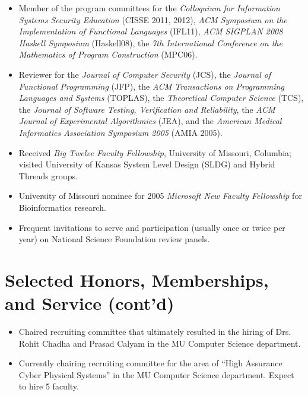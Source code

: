 \documentclass[11pt]{article}
\begin{document}
\begin{itemize}[leftmargin=0mm]
\item[]  Member of the program committees for the {\em Colloquium for Information Systems Security Education} (CISSE 2011, 2012), {\em ACM Symposium on the Implementation of Functional Languages} (IFL11), {\em ACM SIGPLAN 2008
    Haskell Symposium} (Haskell08), the {\em 7th International
Conference on the Mathematics of Program Construction} (MPC06).

\item[] Reviewer for the {\em Journal of Computer Security} (JCS), the {\em Journal of Functional Programming} (JFP),
the {\em ACM Transactions on Programming Languages and Systems} (TOPLAS),
the {\em Theoretical Computer Science} (TCS),
the {\em Journal of Software Testing, Verification and Reliability},
the {\em ACM Journal of Experimental Algorithmics} (JEA), and the {\em American
Medical Informatics Association Symposium 2005} (AMIA 2005). 


\item[] Received \emph{Big Twelve Faculty Fellowship}, University of
  Missouri, Columbia; visited University of Kansas System Level Design (SLDG)
  and Hybrid Threads groups.


\item[] University of Missouri nominee for 2005 {\em Microsoft New Faculty Fellowship} for Bioinformatics research.

\item[] Frequent invitations to serve and participation (usually once or twice per year)  on National Science Foundation review panels.
\end{itemize}

\section{Selected Honors, Memberships, and Service (cont'd)}

\begin{itemize}[leftmargin=0.0mm]

\item[] Chaired recruiting committee that ultimately resulted in the hiring of Drs. Rohit Chadha and Prasad Calyam in the MU Computer Science department. 


\item[] Currently chairing recruiting committee for the area of ``High Assurance Cyber Physical Systems'' in the MU Computer Science department. Expect to hire 5 faculty.

\end{itemize}
\end{document}
